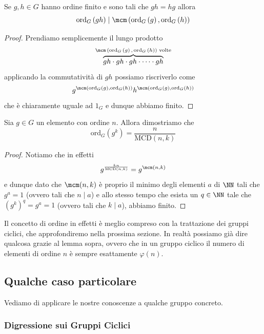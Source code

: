 \documentclass[11pt]{scrartcl}
\newcommand{\MCD}{\text{MCD}}
\newcommand{\ordine}[2]{\text{ord}_{#1}\left(#2\right)}
\begin{document}
	\begin{proposition}
		Se $g,h\in G$ hanno ordine finito e sono tali che $gh=hg$ allora 
		$$\ordine{G}{gh}\mid \mcm\left(\ordine{G}{g},\ordine{G}{h}\right)$$
	\end{proposition}
	\begin{proof}
		Prendiamo semplicemente il lungo prodotto
		$$\overset{\text{$\mcm\left(\ordine{G}{g},\ordine{G}{h}\right)$ volte}}{\overbrace{gh\cdot gh \cdot gh \cdot \dots \cdot gh}}$$
		applicando la commutatività di $gh$ possiamo riscriverlo come
		$$g^{\mcm\left(\ordine{G}{g},\ordine{G}{h}\right)}h^{\mcm\left(\ordine{G}{g},\ordine{G}{h}\right)}$$
		che è chiaramente uguale ad $1_G$ e dunque abbiamo finito.
	\end{proof}
	\begin{lemma}\label{gruppi:ordine di una potenza}
		Sia $g\in G$ un elemento con ordine $n$. Allora dimostriamo che
		$$\ordine{G}{g^k}=\frac{n}{\MCD(n,k)}$$
	\end{lemma}
	\begin{proof}
		Notiamo che in effetti 
		$$g^{\frac{kn}{\MCD(n,k)}}=g^{\mcm(n,k)}$$
		e dunque dato che $\mcm(n,k)$ è proprio il minimo degli elementi $a$ di $\NN$ tali che $g^a=1$ (ovvero tali che $n\mid a$) e allo stesso tempo che esista un $q\in \NN$ tale che $(g^k)^q=g^a=1$ (ovvero tali che $k\mid a$), abbiamo finito.  
	\end{proof}
	Il concetto di ordine in effetti è meglio compreso con la trattazione dei gruppi ciclici, che approfondiremo nella prossima sezione. In realtà possiamo già dire qualcosa grazie al lemma sopra, ovvero che in un gruppo ciclico il numero di elementi di ordine $n$ è sempre esattamente $\varphi(n)$.
	
	\subsection{Qualche caso particolare}
	
	Vediamo di applicare le nostre conoscenze a qualche gruppo concreto.
	
	\subsubsection{Digressione sui Gruppi Ciclici}
	
\end{document}
